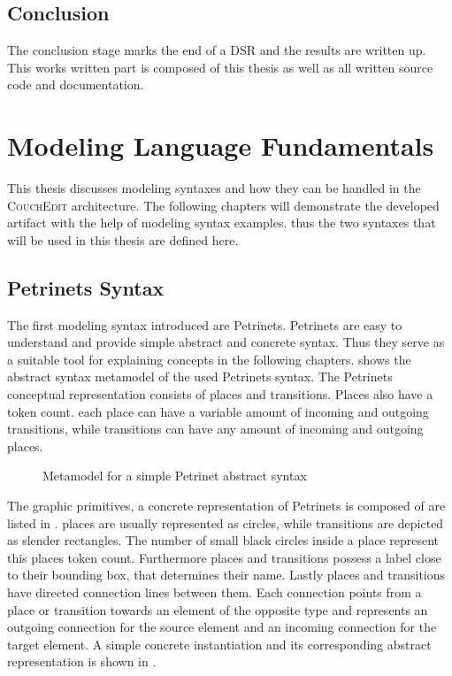 \subsection{Conclusion}
The conclusion stage marks the end of a DSR and the results are written up. This works written part is composed of this thesis as well as all written source code and documentation.


\section{Modeling Language Fundamentals}
\label{sec:modeling-languages}
This thesis discusses modeling syntaxes and how they can be handled in the \textsc{CouchEdit} architecture. The following chapters will demonstrate the developed artifact with the help of modeling syntax examples. thus the two syntaxes that will be used in this thesis are defined here.

\subsection{Petrinets Syntax}
\label{sec:petrinets}
The first modeling syntax introduced are Petrinets. Petrinets are easy to understand and provide simple abstract and concrete syntax. Thus they serve as a suitable tool for explaining concepts in the following chapters.  shows the abstract syntax metamodel of the used Petrinets syntax. The Petrinets conceptual representation consists of places and transitions. Places also have a token count. each place can have a variable amount of incoming and outgoing transitions, while transitions can have any amount of incoming and outgoing places. 

\begin{figure}[H]
  \centering
  
  \caption{Metamodel for a simple Petrinet abstract syntax}
  \label{fig:petrinets_metamodel}
\end{figure}

The graphic primitives, a concrete representation of Petrinets is composed of are listed in . places are usually represented as circles, while transitions are depicted as slender rectangles. The number of small black circles inside a place represent this places token count. Furthermore places and transitions possess a label close to their bounding box, that determines their name. Lastly places and transitions have directed connection lines between them. Each connection points from a place or transition towards an element of the opposite type and represents an outgoing connection for the source element and an incoming connection for the target element. A simple concrete instantiation and its corresponding abstract representation is shown in .

